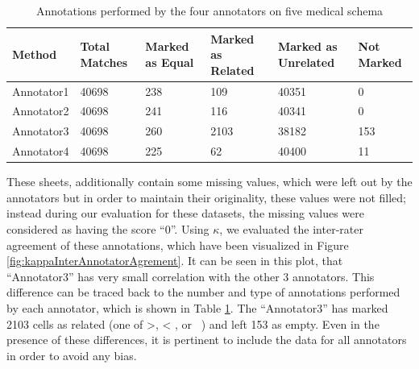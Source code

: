 \documentclass{ieeeaccess}
\begin{document}
\begin{table}
	\centering
	\caption{Annotations performed by the four annotators on five medical schema}
	\label{tab:annotator_marking}
	\begin{tabular}{|l|l|l|l|l|l|}
		\hline
		Method     & Total Matches & Marked as Equal & Marked as Related & Marked as Unrelated & Not Marked \\ \hline
		Annotator1 & 40698         & 238             & 109               & 40351               & 0          \\
		Annotator2 & 40698         & 241             & 116               & 40341               & 0          \\
		Annotator3 & 40698         & 260             & 2103              & 38182               & 153        \\
		Annotator4 & 40698         & 225             & 62                & 40400               & 11         \\ \hline
	\end{tabular}
\end{table}

These sheets, additionally contain some missing values, which were left out by the annotators but in order to maintain their originality, these values were not filled; instead during our evaluation for these datasets, the missing values were considered as having the score ``0''. Using $\kappa$, we evaluated the inter-rater agreement of these annotations, which have been visualized in Figure \ref{fig:kappaInterAnnotatorAgrement}. It can be seen in this plot, that ``Annotator3'' has very small correlation with the other 3 annotators. This difference can be traced back to the number and type of annotations performed by each annotator, which is shown in Table \ref{tab:annotator_marking}. The ``Annotator3'' has marked 2103 cells as related (one of >, < , or ~) and left 153 as empty. Even in the presence of these differences, it is pertinent to include the data for all annotators in order to avoid any bias. 
\end{document}
